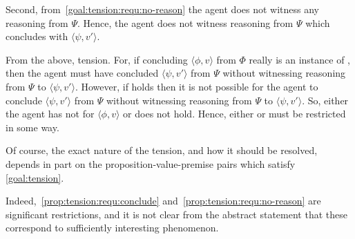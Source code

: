 \begin{note}[Goal]
  Second, from~\autoref{goal:tension:requ:no-reason} the agent does not witness any reasoning from \(\Psi\).
  Hence, the agent does not witness reasoning from \(\Psi\) which concludes with \(\langle \psi,v' \rangle\).

  From the above, tension.
  For, if concluding \(\langle \phi,v \rangle\) from \(\Phi\) really is an instance of \csN{}, then the agent must have concluded \(\langle \psi,v' \rangle\) from \(\Psi\) without witnessing reasoning from \(\Psi\) to \(\langle \psi,v' \rangle\).
  However, if \ESU{} holds then it is not possible for the agent to conclude \(\langle \psi,v' \rangle\) from \(\Psi\) without witnessing reasoning from \(\Psi\) to \(\langle \psi,v' \rangle\).
  So, either the agent has not \csN{} for \(\langle \phi,v \rangle\) or \ESU{} does not hold.
  Hence, either \csN{} or \ESU{} must be restricted in some way.

  Of course, the exact nature of the tension, and how it should be resolved, depends in part on the proposition-value-premise pairs which satisfy \autoref{goal:tension}.

  Indeed,~\autoref{prop:tension:requ:conclude} and~\autoref{prop:tension:requ:no-reason} are significant restrictions, and it is not clear from the abstract statement that these correspond to sufficiently interesting phenomenon.
\end{note}


